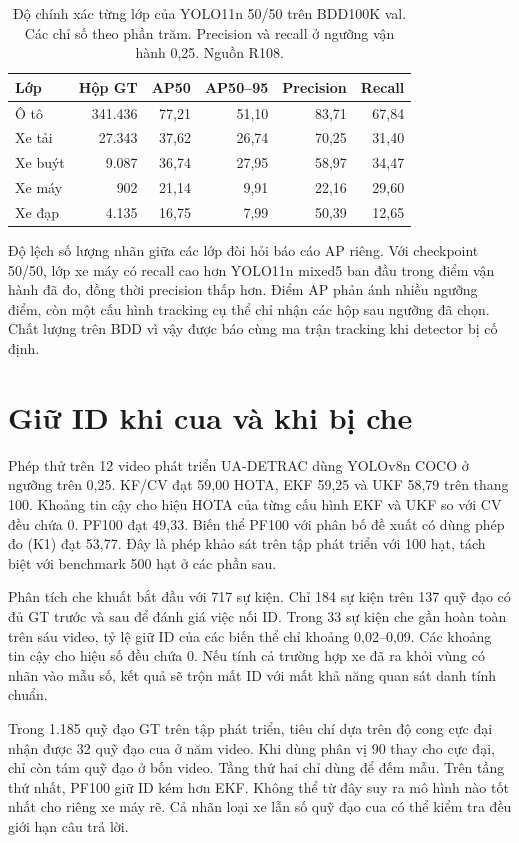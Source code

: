 \begin{table}[htbp]\centering\small
\caption{Độ chính xác từng lớp của YOLO11n 50/50 trên BDD100K val. Các chỉ số theo phần trăm. Precision và recall ở ngưỡng vận hành 0,25. Nguồn R108.}\label{tab:ap-classes}
\begin{tabular}{lrrrrr}\toprule
Lớp & Hộp GT & AP50 & AP50--95 & Precision & Recall\\\midrule
Ô tô & 341.436 & 77,21 & 51,10 & 83,71 & 67,84\\
Xe tải & 27.343 & 37,62 & 26,74 & 70,25 & 31,40\\
Xe buýt & 9.087 & 36,74 & 27,95 & 58,97 & 34,47\\
Xe máy & 902 & 21,14 & 9,91 & 22,16 & 29,60\\
Xe đạp & 4.135 & 16,75 & 7,99 & 50,39 & 12,65\\\bottomrule
\end{tabular}
\end{table}
Độ lệch số lượng nhãn giữa các lớp đòi hỏi báo cáo AP riêng. Với checkpoint 50/50, lớp xe máy có recall cao hơn YOLO11n mixed5 ban đầu trong điểm vận hành đã đo, đồng thời precision thấp hơn. Điểm AP phản ánh nhiều ngưỡng điểm, còn một cấu hình tracking cụ thể chỉ nhận các hộp sau ngưỡng đã chọn. Chất lượng trên BDD vì vậy được báo cùng ma trận tracking khi detector bị cố định.

\section{Giữ ID khi cua và khi bị che}
Phép thử trên 12 video phát triển UA-DETRAC dùng YOLOv8n COCO ở ngưỡng trên 0,25. KF/CV đạt 59,00 HOTA, EKF 59,25 và UKF 58,79 trên thang 100. Khoảng tin cậy cho hiệu HOTA của từng cấu hình EKF và UKF so với CV đều chứa 0. PF100 đạt 49,33. Biến thể PF100 với phân bố đề xuất có dùng phép đo (K1) đạt 53,77. Đây là phép khảo sát trên tập phát triển với 100 hạt, tách biệt với benchmark 500 hạt ở các phần sau.

Phân tích che khuất bắt đầu với 717 sự kiện. Chỉ 184 sự kiện trên 137 quỹ đạo có đủ GT trước và sau để đánh giá việc nối ID. Trong 33 sự kiện che gần hoàn toàn trên sáu video, tỷ lệ giữ ID của các biến thể chỉ khoảng 0,02--0,09. Các khoảng tin cậy cho hiệu số đều chứa 0. Nếu tính cả trường hợp xe đã ra khỏi vùng có nhãn vào mẫu số, kết quả sẽ trộn mất ID với mất khả năng quan sát danh tính chuẩn.

Trong 1.185 quỹ đạo GT trên tập phát triển, tiêu chí dựa trên độ cong cực đại nhận được 32 quỹ đạo cua ở năm video. Khi dùng phân vị 90 thay cho cực đại, chỉ còn tám quỹ đạo ở bốn video. Tầng thứ hai chỉ dùng để đếm mẫu. Trên tầng thứ nhất, PF100 giữ ID kém hơn EKF. Không thể từ đây suy ra mô hình nào tốt nhất cho riêng xe máy rẽ. Cả nhãn loại xe lẫn số quỹ đạo cua có thể kiểm tra đều giới hạn câu trả lời.

